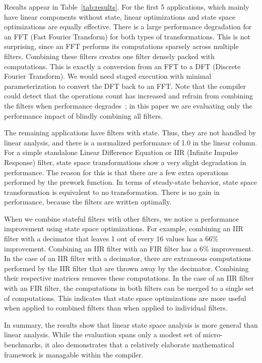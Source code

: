 Results appear in Table~\ref{tab:results}.  For the first 5
applications, which mainly have linear components without state,
linear optimizations and state space optimizations are equally
effective. There is a large performance degradation for an FFT (Fast
Fourier Transform) for both types of transformations. This is not
surprising, since an FFT performs its computations sparsely across
multiple filters. Combining these filters creates one filter densely
packed with computations. This is exactly a conversion from an FFT to
a DFT (Discrete Fourier Transform).  We would need staged execution
with minimal parameterization to convert the DFT back to an FFT.  Note
that the compiler could detect that the operations count has increased
and refrain from combining the filters when performance
degrades~\cite{Lamb}; in this paper we are evaluating only the
performance impact of blindly combining all filters.

The remaining applications have filters with state.  Thus, they are
not handled by linear analysis, and there is a normalized performance
of 1.0 in the linear column.  For a simple standalone Linear
Difference Equation or IIR (Infinite Impulse Response) filter,
state space transformations show a very slight degradation in
performance. The reason for this is that there are a few extra
operations performed by the prework function. In terms of steady-state
behavior, state space transformation is equivalent to no
transformation. There is no gain in performance, because the filters
are written optimally.

When we combine stateful filters with other filters, we notice a
performance improvement using state space optimizations. For example,
combining an IIR filter with a decimator that leaves 1 out of every 16
values has a 66\% improvement. Combining an IIR filter with an FIR
filter has a 6\% improvement. In the case of an IIR filter with a
decimator, there are extraneous computations performed by the IIR
filter that are thrown away by the decimator.  Combining their
respective matrices removes these computations. In the case of an IIR
filter with an FIR filter, the computations in both filters can be
merged to a single set of computations. This indicates that
state space optimizations are more useful when applied to combined
filters than when applied to individual filters.

In summary, the results show that linear state space analysis is more
general than linear analysis.  While the evaluation spans only a
modest set of micro-benchmarks, it also demonstrates that a relatively
elaborate mathematical framework is managable within the compiler.
